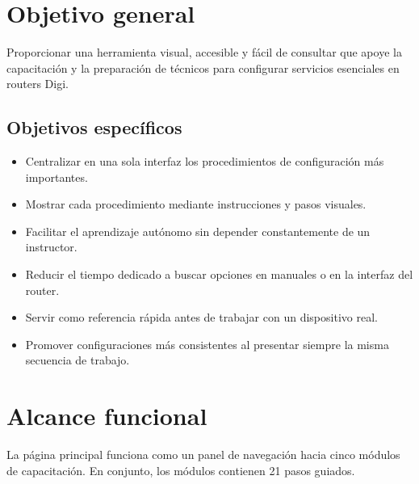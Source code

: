 \documentclass[12pt,letterpaper]{article}
\begin{document}
\section{Objetivo general}

Proporcionar una herramienta visual, accesible y fácil de consultar que apoye la
capacitación y la preparación de técnicos para configurar servicios esenciales en
routers Digi.

\subsection{Objetivos específicos}

\begin{itemize}[leftmargin=*]
    \item Centralizar en una sola interfaz los procedimientos de configuración más
    importantes.
    \item Mostrar cada procedimiento mediante instrucciones y pasos visuales.
    \item Facilitar el aprendizaje autónomo sin depender constantemente de un
    instructor.
    \item Reducir el tiempo dedicado a buscar opciones en manuales o en la interfaz
    del router.
    \item Servir como referencia rápida antes de trabajar con un dispositivo real.
    \item Promover configuraciones más consistentes al presentar siempre la misma
    secuencia de trabajo.
\end{itemize}

\section{Alcance funcional}

La página principal funciona como un panel de navegación hacia cinco módulos de
capacitación. En conjunto, los módulos contienen 21 pasos guiados.
\end{document}
